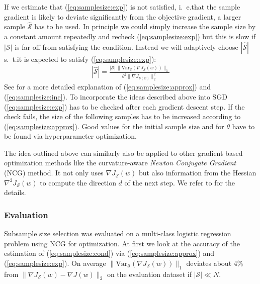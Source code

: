 If we estimate that (\ref{eq:samplesize:exp}) is not satisfied, i.~e.\@ that the sample gradient is likely to deviate significantly from the objective gradient, a larger sample \(\widehat{\mathcal{S}}\) has to be used.
In principle we could simply increase the sample size by a constant amount repeatedly and recheck (\ref{eq:samplesize:exp}) but this is slow if \(|\mathcal{S}|\) is far off from satisfying the condition.
Instead we will adaptively choose \(|\widehat{\mathcal{S}}|\) s.~t.\@ it is expected to satisfy (\ref{eq:samplesize:exp}):
\begin{align}
	|\widehat{\mathcal{S}}| = \frac{|\mathcal{S}|\, \|\mathrm{Var}_{\mathcal{S}}(\nabla J_{\mathcal{S}}(w))\|_1}{\theta^2 \|\nabla J_{\mathcal{S}(w)}\|_2^2}\label{eq:samplesize:inc}
\end{align}
See \citet[chapter~3]{Byrd2012} for a more detailed explanation of (\ref{eq:samplesize:approx}) and (\ref{eq:samplesize:inc}).
To incorporate the ideas described above into SGD (\ref{eq:samplesize:exp}) has to be checked after each gradient descent step.
If the check fails, the size of the following samples has to be increased according to (\ref{eq:samplesize:approx}).
Good values for the initial sample size and for \(\theta\) have to be found via hyperparameter optimization.

The idea outlined above can similarly also be applied to other gradient based optimization methods like the curvature-aware \textit{Newton Conjugate Gradient} (NCG) method.
It not only uses \(\nabla J_{\mathcal{S}}(w)\) but also information from the Hessian \(\nabla^2 J_{\mathcal{S}}(w)\) to compute the direction \(d\) of the next step.
We refer to \citet[chapter~5]{Byrd2012} for the details.

\subsubsection{Evaluation}%
\label{sec:params:samplesize:eval}

Subsample size selection was evaluated on a multi-class logistic regression problem using NCG for optimization.
At first we look at the accuracy of the estimation of (\ref{eq:samplesize:cond}) via (\ref{eq:samplesize:approx}) and (\ref{eq:samplesize:exp}).
On average \(\|\mathrm{Var}_{\mathcal{S}}(\nabla J_{\mathcal{S}}(w))\|_1\) deviates about 4\% from \(\|\nabla J_{\mathcal{S}}(w) - \nabla J(w) \|_2\) on the evaluation dataset if \(|\mathcal{S}| \ll N\).

